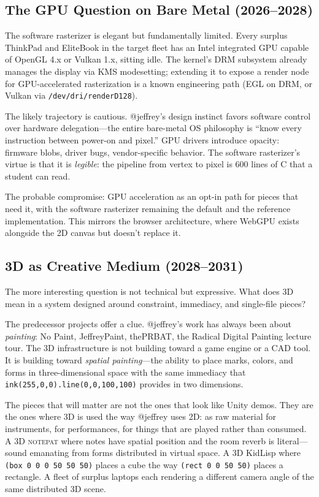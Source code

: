 \documentclass[10pt,letterpaper,twocolumn]{article}
\newcommand{\np}{\textsc{notepat}}
\begin{document}
\subsection{The GPU Question on Bare Metal (2026--2028)}

The software rasterizer is elegant but fundamentally limited. Every surplus ThinkPad and EliteBook in the target fleet has an Intel integrated GPU capable of OpenGL 4.x or Vulkan 1.x, sitting idle. The kernel's DRM subsystem already manages the display via KMS modesetting; extending it to expose a render node for GPU-accelerated rasterization is a known engineering path (EGL on DRM, or Vulkan via \texttt{/dev/dri/renderD128}).

The likely trajectory is cautious. @jeffrey's design instinct favors software control over hardware delegation---the entire bare-metal OS philosophy is ``know every instruction between power-on and pixel.'' GPU drivers introduce opacity: firmware blobs, driver bugs, vendor-specific behavior. The software rasterizer's virtue is that it is \emph{legible}: the pipeline from vertex to pixel is 600 lines of C that a student can read.

The probable compromise: GPU acceleration as an opt-in path for pieces that need it, with the software rasterizer remaining the default and the reference implementation. This mirrors the browser architecture, where WebGPU exists alongside the 2D canvas but doesn't replace it.

\subsection{3D as Creative Medium (2028--2031)}

The more interesting question is not technical but expressive. What does 3D mean in a system designed around constraint, immediacy, and single-file pieces?

The predecessor projects offer a clue. @jeffrey's work has always been about \emph{painting}: No Paint, JeffreyPaint, thePRBAT, the Radical Digital Painting lecture tour. The 3D infrastructure is not building toward a game engine or a CAD tool. It is building toward \emph{spatial painting}---the ability to place marks, colors, and forms in three-dimensional space with the same immediacy that \texttt{ink(255,0,0).line(0,0,100,100)} provides in two dimensions.

The pieces that will matter are not the ones that look like Unity demos. They are the ones where 3D is used the way @jeffrey uses 2D: as raw material for instruments, for performances, for things that are played rather than consumed. A 3D \np{} where notes have spatial position and the room reverb is literal---sound emanating from forms distributed in virtual space. A 3D KidLisp where \texttt{(box 0 0 0 50 50 50)} places a cube the way \texttt{(rect 0 0 50 50)} places a rectangle. A fleet of surplus laptops each rendering a different camera angle of the same distributed 3D scene.
\end{document}
